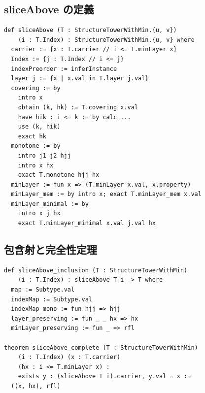 \documentclass[a4paper,11pt]{article}
\theoremstyle{definition}
\begin{document}
\subsection{sliceAbove の定義}

\begin{lstlisting}[style=leanstyle, caption=sliceAbove の定義]
def sliceAbove (T : StructureTowerWithMin.{u, v}) 
    (i : T.Index) : StructureTowerWithMin.{u, v} where
  carrier := {x : T.carrier // i <= T.minLayer x}
  Index := {j : T.Index // i <= j}
  indexPreorder := inferInstance
  layer j := {x | x.val in T.layer j.val}
  covering := by
    intro x
    obtain (k, hk) := T.covering x.val
    have hik : i <= k := by calc ...
    use (k, hik)
    exact hk
  monotone := by
    intro j1 j2 hjj
    intro x hx
    exact T.monotone hjj hx
  minLayer := fun x => (T.minLayer x.val, x.property)
  minLayer_mem := by intro x; exact T.minLayer_mem x.val
  minLayer_minimal := by
    intro x j hx
    exact T.minLayer_minimal x.val j.val hx
\end{lstlisting}

\subsection{包含射と完全性定理}

\begin{lstlisting}[style=leanstyle, caption=包含射と完全性]
def sliceAbove_inclusion (T : StructureTowerWithMin) 
    (i : T.Index) : sliceAbove T i -> T where
  map := Subtype.val
  indexMap := Subtype.val
  indexMap_mono := fun hjj => hjj
  layer_preserving := fun _ _ hx => hx
  minLayer_preserving := fun _ => rfl

theorem sliceAbove_complete (T : StructureTowerWithMin) 
    (i : T.Index) (x : T.carrier) 
    (hx : i <= T.minLayer x) :
    exists y : (sliceAbove T i).carrier, y.val = x :=
  ((x, hx), rfl)
\end{lstlisting}
\end{document}
